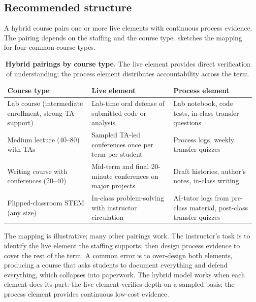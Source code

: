 \documentclass{SIAMbook2023}
\begin{document}
\subsection{Recommended structure}
\label{i:subsec:hybrid-structure}

A hybrid course pairs one or more live elements with continuous process evidence. The pairing depends on the staffing and the course type.  sketches the mapping for four common course types.

\begin{table}[ht]
\centering
\caption{\textbf{Hybrid pairings by course type.} The live element provides direct verification of understanding; the process element distributes accountability across the term.}
\label{tab:hybrid-mapping}
\begin{tabularx}{\textwidth}{>{\raggedright\arraybackslash}X >{\raggedright\arraybackslash}X >{\raggedright\arraybackslash}X}
\toprule
\textbf{Course type} & \textbf{Live element} & \textbf{Process element} \\
\midrule
Lab course (intermediate enrollment, strong TA support) & Lab-time oral defense of submitted code or analysis & Lab notebook, code tests, in-class transfer questions \\
\addlinespace
Medium lecture (40--80) with TAs & Sampled TA-led conferences once per term per student & Process logs, weekly transfer quizzes \\
\addlinespace
Writing course with conferences (20--40) & Mid-term and final 20-minute conferences on major projects & Draft histories, author's notes, in-class writing \\
\addlinespace
Flipped-classroom STEM (any size) & In-class problem-solving with instructor circulation & AI-tutor logs from pre-class material, post-class transfer quizzes \\
\bottomrule
\end{tabularx}
\end{table}

The mapping is illustrative; many other pairings work. The instructor's task is to identify the live element the staffing supports, then design process evidence to cover the rest of the term. A common error is to over-design both elements, producing a course that asks students to document everything and defend everything, which collapses into paperwork. The hybrid model works when each element does its part: the live element verifies depth on a sampled basis; the process element provides continuous low-cost evidence.
\end{document}
